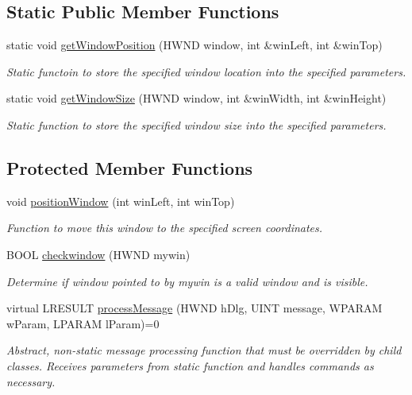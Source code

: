\subsection*{Static Public Member Functions}
\begin{DoxyCompactItemize}
\item 
static void \hyperlink{class_dialog_base_a82265919140a1dacca70d73bc5a3399a}{getWindowPosition} (HWND window, int \&winLeft, int \&winTop)
\begin{DoxyCompactList}\small\item\em Static functoin to store the specified window location into the specified parameters. \end{DoxyCompactList}\item 
static void \hyperlink{class_dialog_base_a0b0be03a8583864accb55d7f1627b594}{getWindowSize} (HWND window, int \&winWidth, int \&winHeight)
\begin{DoxyCompactList}\small\item\em Static function to store the specified window size into the specified parameters. \end{DoxyCompactList}\end{DoxyCompactItemize}
\subsection*{Protected Member Functions}
\begin{DoxyCompactItemize}
\item 
void \hyperlink{class_dialog_base_a2e8348ef1fed6e6ec68c2dbe86a16dc2}{positionWindow} (int winLeft, int winTop)
\begin{DoxyCompactList}\small\item\em Function to move this window to the specified screen coordinates. \end{DoxyCompactList}\item 
BOOL \hyperlink{class_dialog_base_a94d2ce4729c7ae992f4c4be4461859da}{checkwindow} (HWND mywin)
\begin{DoxyCompactList}\small\item\em Determine if window pointed to by mywin is a valid window and is visible. \end{DoxyCompactList}\item 
virtual LRESULT \hyperlink{class_dialog_base_aac84de8c20f2b47ee3de73749922e880}{processMessage} (HWND hDlg, UINT message, WPARAM wParam, LPARAM lParam)=0
\begin{DoxyCompactList}\small\item\em Abstract, non-\/static message processing function that must be overridden by child classes. Receives parameters from static function and handles commands as necessary. \end{DoxyCompactList}\end{DoxyCompactItemize}
